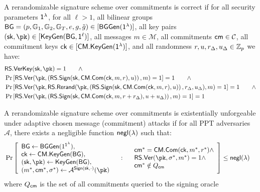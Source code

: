 \begin{definition} 
A rerandomizable signature scheme over commitments is correct if for all security parameters $\mathsf{1^{\lambda}}$, for all $\ell > 1$, all bilinear groups $\mathsf{BG} = (p, \mathbb{G}_1, \mathbb{G}_2, \mathbb{G}_T, e, g, \tilde{g}) \in [\mathsf{BGGen}(\mathsf{1^{\lambda}})]$, all key pairs $(\sk, \pk) \in [\mathsf{KeyGen}(\mathsf{BG, 1^{\ell}})]$, all messages $m \in \mathcal{M}$, all commitments $\mathsf{cm} \in \mathcal{C}$, all commitment keys $\mathsf{ck} \in [\mathsf{CM.KeyGen}(\mathsf{1^{\lambda}})]$, and all randomness $r, u, r_\Delta, u_\Delta \in \mathbb{Z}_p$ we have:
    \begin{align*}
        &\mathsf{RS.VerKey}(\sk, \pk) = 1 \qquad \wedge \\
        &\Pr \left[ \mathsf{RS.Ver}(\pk, \left(\mathsf{RS.Sign}(\mathsf{sk}, \mathsf{CM.Com}(\mathsf{ck}, m, r), u)\right), m) = 1 \right] =1 \qquad \wedge \\
        &\Pr \left[ \mathsf{RS.Ver}(\pk, \mathsf{RS.Rerand}(\pk,\left(\mathsf{RS.Sign}(\mathsf{sk}, \mathsf{CM.Com}(\mathsf{ck}, m, r), u)\right),r_\Delta, u_\Delta), m) = 1 \right] =1 \qquad \wedge \\
        &\Pr \left[ \mathsf{RS.Ver}(\pk, \left(\mathsf{RS.Sign}(\mathsf{sk}, \mathsf{CM.Com}(\mathsf{ck}, m, r+r_\Delta), u+u_\Delta)\right), m) = 1 \right] = 1\\
    \end{align*}
\end{definition}



\begin{definition}
A rerandomizable signature scheme over commitments is existentially unforgeable under adaptive chosen message (commitment) attacks if for all PPT adversaries $\mathcal{A}$, there exists a negligible function ${\mathsf{negl}(\lambda)}$ such that:
    \begin{align*}
        &\Pr\left[
            \begin{array}{l}
                \mathsf{BG} \gets \mathsf{BGGen}(1^{\secparam}), \\
                \mathsf{ck} \gets \mathsf{CM.KeyGen}(\mathsf{BG}), \\
                (\sk, \pk) \gets \mathsf{KeyGen}(\mathsf{BG}), \\
                (m^*, \cm^*, \sigma^*) \gets \mathcal{A}^{\mathsf{Sign}(\sk, \cdot)}(\pk) \\
                \end{array}
                \quad : \quad
                \begin{array}{l}
                \cm^* = \mathsf{CM.Com}(\mathsf{ck}, m^*, r^*) \land \\
                \mathsf{RS.Ver}(\pk, \sigma^*, m^*) = 1 \land \\
                \cm^* \notin Q_{\cm}
            \end{array}
        \right] \leq \negl
    \end{align*}
where $Q_{\mathsf{cm}}$ is the set of all commitments queried to the signing oracle
\end{definition}


